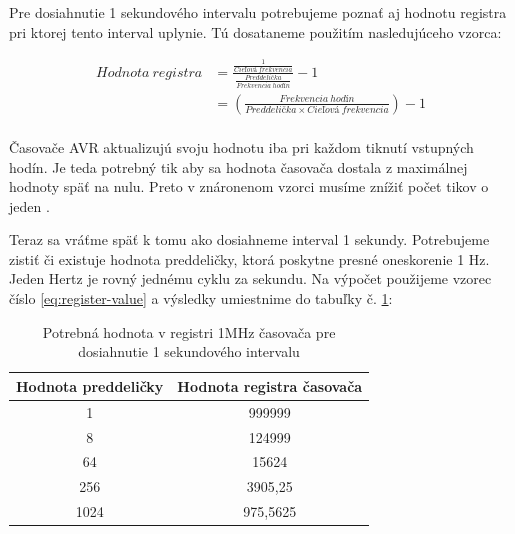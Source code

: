 Pre dosiahnutie 1 sekundového intervalu potrebujeme poznať aj hodnotu registra
pri ktorej tento interval uplynie. Tú dosataneme použitím nasledujúceho vzorca:

\begin{equation} \label{eq:register-value}
    \begin{aligned}
        Hodnota\:registra & = \frac{ \frac{1}{Cieľová\:frekvencia}} { \frac{Preddelička}{Frekvencia\:hodín}} - 1 \\
                          & = (\frac{Frekvencia\:hodín}{Preddelička \times Cieľová\:frekvencia}) - 1             \\
    \end{aligned}
\end{equation}

Časovače AVR aktualizujú svoju hodnotu iba pri každom tiknutí vstupných hodín.
Je teda potrebný tik aby sa hodnota časovača dostala z maximálnej hodnoty späť na nulu. Preto v znáronenom vzorci
musíme znížiť počet tikov o jeden \cite{atmelATmega64012801281}. \par

Teraz sa vráťme späť k tomu ako dosiahneme interval 1 sekundy.
Potrebujeme zistiť či existuje hodnota preddeličky, ktorá poskytne presné oneskorenie 1 Hz. Jeden Hertz je rovný jednému cyklu za sekundu. Na výpočet použijeme vzorec
číslo \ref{eq:register-value} a výsledky umiestnime do tabuľky č. \ref{table:timerPrescalerValues}:

\begin{table}[!htbp]
    \begin{center}
        \begin{tabular}{|c|c|}
            \hline
            Hodnota preddeličky & Hodnota registra časovača \\
            \hline
            1                   & 999999                    \\
            8                   & 124999                    \\
            64                  & 15624                     \\
            256                 & 3905,25                   \\
            1024                & 975,5625                  \\
            \hline
        \end{tabular}
        \caption{Potrebná hodnota v registri 1MHz časovača pre dosiahnutie 1 sekundového intervalu}
        \label{table:timerPrescalerValues}
    \end{center}
\end{table}


